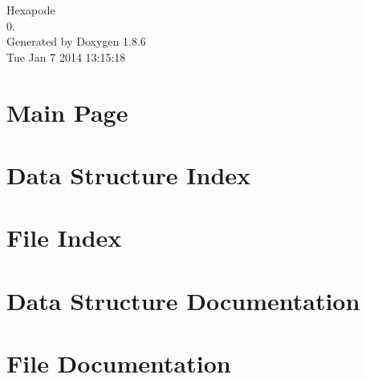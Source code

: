 \documentclass[twoside]{book}
\newcommand{\clearemptydoublepage}{%
  \newpage{\pagestyle{empty}\cleardoublepage}%
}
\begin{document}
\hypersetup{pageanchor=false}
\begin{titlepage}
\vspace*{7cm}
\begin{center}%
{\Large Hexapode \\[1ex]\large 0. }\\
\vspace*{1cm}
{\large Generated by Doxygen 1.8.6}\\
\vspace*{0.5cm}
{\small Tue Jan 7 2014 13:15:18}\\
\end{center}
\end{titlepage}
\clearemptydoublepage
\tableofcontents
\clearemptydoublepage
{}
\hypersetup{pageanchor=true}

\chapter{Main Page}
\label{index}\hypertarget{index}{}
\chapter{Data Structure Index}

\chapter{File Index}

\chapter{Data Structure Documentation}


\chapter{File Documentation}



















































\newpage
{}
{}
\printindex
\end{document}
